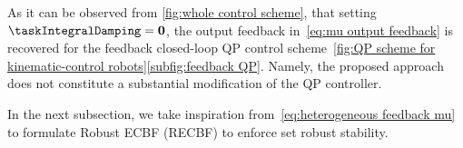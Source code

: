 As it can be observed from \cref{fig:whole control scheme}, that setting $\taskIntegralDamping =\mathbf{0}$, the output feedback in~\cref{eq:mu output feedback} 
is recovered for the feedback closed-loop QP control scheme~\cref{fig:QP scheme for kinematic-control robots}\ref{subfig:feedback QP}. Namely, the proposed approach does not constitute a substantial modification of the QP controller. 


In the next subsection, we take inspiration from~\cref{eq:heterogeneous feedback mu} to formulate Robust ECBF (RECBF) to enforce set robust stability. 



